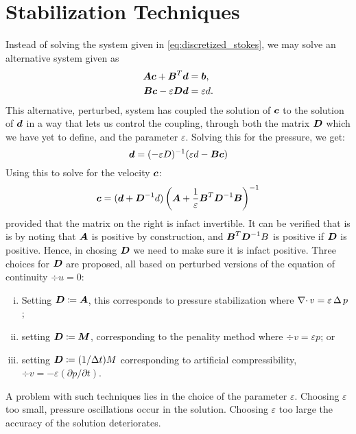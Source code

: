 \section{Stabilization Techniques}

Instead of solving the system given in \cref{eq:discretized_stokes}, we may
solve an alternative system given as
\begin{align}
    \boldsymbol{A}\boldsymbol{c} + \boldsymbol{B}^T \boldsymbol{d} &= \boldsymbol{b}, \\
    \boldsymbol{B}\boldsymbol{c} - \varepsilon \boldsymbol{D} \boldsymbol{d} &= \varepsilon d.
\end{align}
This alternative, perturbed,  system has coupled the solution of \( \boldsymbol{c} \) to
the solution of \( \boldsymbol{d} \) in a way that lets us control the coupling, through
both the matrix \( \boldsymbol{D} \) which we have yet to define, and the parameter \(
\varepsilon \).  Solving this for the pressure, we get:
\begin{equation}
    \boldsymbol{d} = (-\varepsilon D)^{-1}(\varepsilon d- \boldsymbol{B} \boldsymbol{c})
\end{equation}
Using this to solve for the velocity \( \boldsymbol{c} \):
\begin{equation}
    \boldsymbol{c} = (\boldsymbol{d} + \boldsymbol{D}^{-1}d) \left(\boldsymbol{A} + \frac{1}{\varepsilon}\boldsymbol{B}^T\boldsymbol{D}^{-1}\boldsymbol{B}\right)^{-1}
\end{equation}
provided that the matrix on the right is infact invertible. It can be verified
that is is by noting that \(\boldsymbol{A}\) is positive by construction, and \( \boldsymbol{B}^T
\boldsymbol{D}^{-1} B \) is positive if \( \boldsymbol{D} \) is positive. Hence, in chosing \( \boldsymbol{D} \) we
need to make sure it is infact positive. Three choices for \( \boldsymbol{D} \) are
proposed, all based on perturbed versions of the equation of continuity \( \div
u = 0 \):
\begin{enumerate}[(i)]
    \item Setting \( \boldsymbol{D} \coloneqq \boldsymbol{A} \), this corresponds to pressure
        stabilization where \(\operatorname{\mathop{}\!\nabla \cdot} v = \varepsilon \operatorname{\mathop{}\!\Delta} p \); 
    \item setting \( \boldsymbol{D} \coloneqq \boldsymbol{M}\), corresponding to the
        penality method where \( \div v = \varepsilon p \); or 
    \item setting \( \boldsymbol{D} \coloneqq (1/\Delta t) M\) corresponding to artificial
        compressibility, \( \div v= -\varepsilon (\partial p/\partial t)
        \).
\end{enumerate}
A problem with such techniques lies in the choice of the parameter \(
\varepsilon \). Choosing \( \varepsilon \) too small, pressure oscillations
occur in the solution. Choosing \( \varepsilon \) too large the accuracy of the
solution deteriorates.
